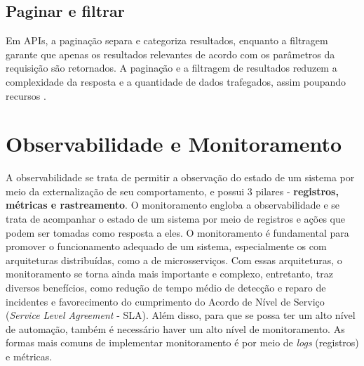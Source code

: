 

\subsection{Paginar e filtrar}
Em APIs, a paginação separa e categoriza resultados, enquanto a filtragem garante que apenas os resultados relevantes de acordo com os parâmetros da requisição são retornados. A paginação e a filtragem de resultados reduzem a complexidade da resposta e a quantidade de dados trafegados, assim poupando recursos \cite{api-design-restfulapi}.


\section{Observabilidade e Monitoramento}\label{observabilidade-monitoramento}
A observabilidade se trata de permitir a observação do estado de um sistema por meio da externalização de seu comportamento, e possui 3 pilares - \textbf{registros, métricas e rastreamento}. O monitoramento engloba a observabilidade e se trata de acompanhar o estado de um sistema por meio de registros e ações que podem ser tomadas como resposta a eles. O monitoramento é fundamental para promover o funcionamento adequado de um sistema, especialmente os com arquiteturas distribuídas, como a de microsserviços. Com essas arquiteturas, o monitoramento se torna ainda mais importante e complexo, entretanto, traz diversos benefícios, como redução de tempo médio de detecção e reparo de incidentes e favorecimento do cumprimento do Acordo de Nível de Serviço (\emph{Service Level Agreement} - SLA). Além disso, para que se possa ter um alto nível de automação, também é necessário haver um alto nível de monitoramento. As formas mais comuns de implementar monitoramento é por meio de \emph{logs} (registros) e métricas.

